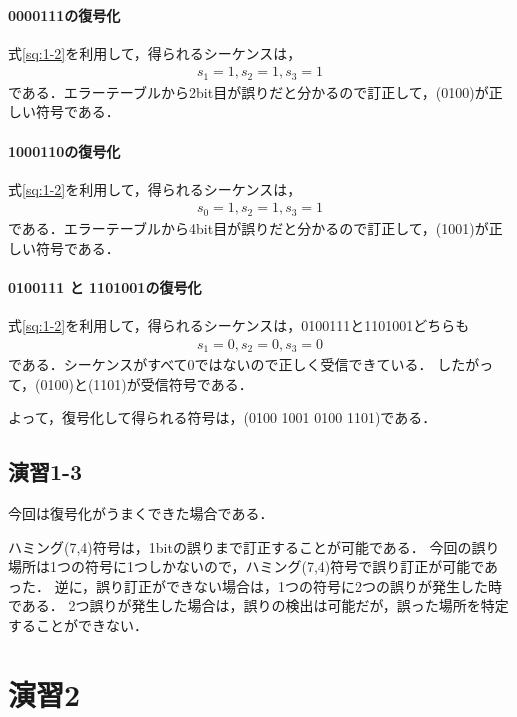 \documentclass[documentclass]{jsarticle}
\begin{document}
\paragraph*{0000111の復号化}
式\ref*{sq:1-2}を利用して，得られるシーケンスは，
\begin{align*}
  s_1 = 1, s_2 = 1, s_3 = 1
\end{align*}
である．エラーテーブルから2bit目が誤りだと分かるので訂正して，(0100)が正しい符号である．

\paragraph*{1000110の復号化}
式\ref*{sq:1-2}を利用して，得られるシーケンスは，
\begin{align*}
  s_0 = 1, s_2 = 1, s_3 = 1
\end{align*}
である．エラーテーブルから4bit目が誤りだと分かるので訂正して，(1001)が正しい符号である．

\paragraph*{0100111 と 1101001の復号化}
式\ref*{sq:1-2}を利用して，得られるシーケンスは，0100111と1101001どちらも
\begin{align*}
  s_1 = 0, s_2 = 0, s_3 = 0
\end{align*}
である．シーケンスがすべて0ではないので正しく受信できている．
したがって，(0100)と(1101)が受信符号である．

よって，復号化して得られる符号は，(0100 1001 0100 1101)である．

\subsection*{演習1-3}
今回は復号化がうまくできた場合である．

ハミング(7,4)符号は，1bitの誤りまで訂正することが可能である．
今回の誤り場所は1つの符号に1つしかないので，ハミング(7,4)符号で誤り訂正が可能であった．
逆に，誤り訂正ができない場合は，1つの符号に2つの誤りが発生した時である．
2つ誤りが発生した場合は，誤りの検出は可能だが，誤った場所を特定することができない．


\newpage

\section*{演習2}
\end{document}
